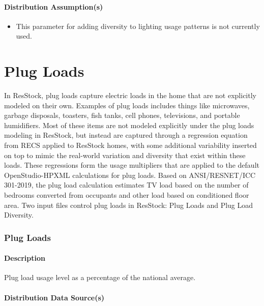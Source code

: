 \paragraph{Distribution Assumption(s)}
\begin{itemize}
 \item
  This parameter for adding diversity to lighting usage patterns is not
  currently used.
\end{itemize}




\section{Plug Loads}
In ResStock, plug loads capture electric loads in the home that are not explicitly modeled on their own. Examples of plug loads includes things like microwaves, garbage disposals, toasters, fish tanks, cell phones, televisions, and portable humidifiers. Most of these items are not modeled explicitly under the plug loads modeling in ResStock, but instead are captured through a regression equation from RECS applied to ResStock homes, with some additional variability inserted on top to mimic the real-world variation and diversity that exist within these loads. These regressions form the usage multipliers that are applied to the default OpenStudio-HPXML calculations for plug loads. Based on ANSI/RESNET/ICC 301-2019, the plug load calculation estimates TV load based on the number of bedrooms converted from occupants and other load based on conditioned floor area. Two input files control plug loads in ResStock: Plug Loads and Plug Load Diversity.

\subsubsection{Plug Loads}\label{plug_loads}


\paragraph{Description}

Plug load usage level as a percentage of the national average.   

\paragraph{Distribution Data Source(s)}

